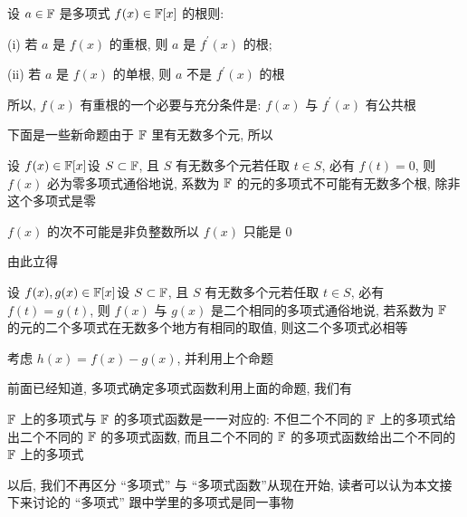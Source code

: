 \begin{proposition}
    设 $a \in \mathbb{F}$ 是多项式 $f(x) \in \mathbb{F}[x]$ 的根\period 则:

    (i) 若 $a$ 是 $f(x)$ 的重根, 则 $a$ 是 $f^{\prime} (x)$ 的根;

    (ii) 若 $a$ 是 $f(x)$ 的单根, 则 $a$ 不是 $f^{\prime} (x)$ 的根\period

    所以, $f(x)$ 有重根的一个必要与充分条件是: $f(x)$ 与 $f^{\prime} (x)$ 有公共根\period
\end{proposition}

下面是一些新命题\period 由于 $\mathbb{F}$ 里有无数多个元, 所以

\begin{proposition}
    设 $f(x) \in \mathbb{F}[x]$\period 设 $S \subset \mathbb{F}$, 且 $S$ 有无数多个元\period 若任取 $t \in S$, 必有 $f(t) = 0$, 则 $f(x)$ 必为零多项式\period 通俗地说, 系数为 $\mathbb{F}$ 的元的多项式不可能有无数多个根, 除非这个多项式是零\period
\end{proposition}

\begin{pf}
    $f(x)$ 的次不可能是非负整数\period 所以 $f(x)$ 只能是 $0$\period
\end{pf}

由此立得

\begin{proposition}
    设 $f(x),g(x) \in \mathbb{F}[x]$\period 设 $S \subset \mathbb{F}$, 且 $S$ 有无数多个元\period 若任取 $t \in S$, 必有 $f(t) = g(t)$, 则 $f(x)$ 与 $g(x)$ 是二个相同的多项式\period 通俗地说, 若系数为 $\mathbb{F}$ 的元的二个多项式在无数多个地方有相同的取值, 则这二个多项式必相等\period
\end{proposition}

\begin{pf}
    考虑 $h(x) = f(x) - g(x)$, 并利用上个命题\period
\end{pf}

前面已经知道, 多项式确定多项式函数\period 利用上面的命题, 我们有

\begin{proposition}
    $\mathbb{F}$ 上的多项式与 $\mathbb{F}$ 的多项式函数是一一对应的: 不但二个不同的 $\mathbb{F}$ 上的多项式给出二个不同的 $\mathbb{F}$ 的多项式函数, 而且二个不同的 $\mathbb{F}$ 的多项式函数给出二个不同的 $\mathbb{F}$ 上的多项式\period
\end{proposition}

\begin{remark}
    以后, 我们不再区分 ``多项式'' 与 ``多项式函数''\period 从现在开始, 读者可以认为本文接下来讨论的 ``多项式'' 跟中学里的多项式是同一事物\period
\end{remark}

